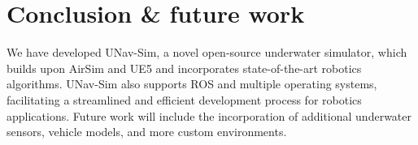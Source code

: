 \section{Conclusion \& future work} \label{sec:unavsim:conclusion}
We have developed UNav-Sim, a novel open-source underwater simulator, which builds upon AirSim and \ac{UE5} and incorporates state-of-the-art robotics algorithms. UNav-Sim also supports \ac{ROS} and multiple operating systems, facilitating a streamlined and efficient development process for robotics applications. Future work will include the incorporation of additional underwater sensors, vehicle models, and more custom environments. 
